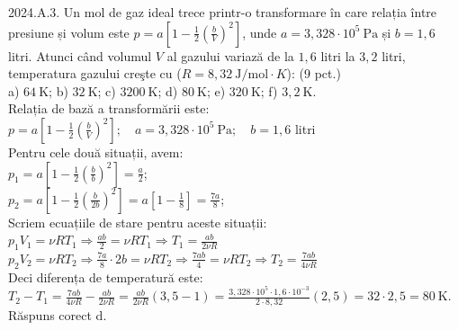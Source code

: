 2024.A.3. Un mol de gaz ideal trece printr-o transformare în care relația între presiune și volum este $p=a\left[1-\frac{1}{2}\left(\frac{b}{V}\right)^{2}\right]$, unde $a=3,328 \cdot 10^{5} \mathrm{~Pa}$ și $b=1,6$ litri. Atunci când volumul $V$ al gazului variază de la $1,6$ litri la $3,2$ litri, temperatura gazului creşte cu ($R=8,32 \mathrm{~J} / \mathrm{mol} \cdot K$): (9 pct.)\\ a) $64 \mathrm{~K}$; b) $32 \mathrm{~K}$; c) $3200 \mathrm{~K}$; d) $80 \mathrm{~K}$; e) $320 \mathrm{~K}$; f) $3,2 \mathrm{~K}$.\\ Relația de bază a transformării este:\\ $p=a\left[1-\frac{1}{2}\left(\frac{b}{V}\right)^{2}\right]; \quad a=3,328 \cdot 10^{5} \mathrm{~Pa}; \quad b=1,6$ litri\\ Pentru cele două situații, avem:\\ $p_{1}=a\left[1-\frac{1}{2}\left(\frac{b}{b}\right)^{2}\right]=\frac{a}{2}$;\\ $p_{2}=a\left[1-\frac{1}{2}\left(\frac{b}{2 b}\right)^{2}\right]=a\left[1-\frac{1}{8}\right]=\frac{7 a}{8}$;\\ Scriem ecuațiile de stare pentru aceste situații:\\ $p_{1} V_{1}=\nu R T_{1} \Rightarrow \frac{a b}{2}=\nu R T_{1} \Rightarrow T_{1}=\frac{a b}{2 \nu R}$\\ $p_{2} V_{2}=\nu R T_{2} \Rightarrow \frac{7 a}{8} \cdot 2 b=\nu R T_{2} \Rightarrow \frac{7 a b}{4}=\nu R T_{2} \Rightarrow T_{2}=\frac{7 a b}{4 \nu R}$\\ Deci diferența de temperatură este:\\ $T_{2}-T_{1}=\frac{7 a b}{4 \nu R}-\frac{a b}{2 \nu R}=\frac{a b}{2 \nu R}(3,5-1)=\frac{3,328 \cdot 10^{5} \cdot 1,6 \cdot 10^{-3}}{2 \cdot 8,32}(2,5)=32 \cdot 2,5=80 \mathrm{~K}$. Răspuns corect d.\\

